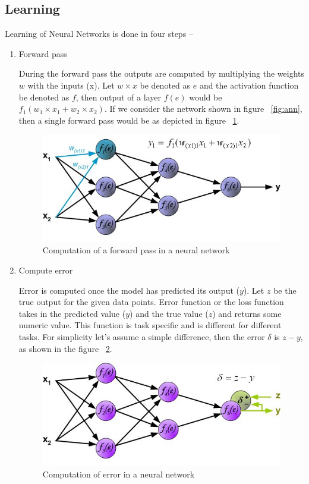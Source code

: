 \subsection{Learning \label{lbl:learning}}


Learning of Neural Networks is done in four steps --

\begin{enumerate}
	\item Forward pass

During the forward pass the outputs are computed by multiplying the weights $w$ with the inputs (x). Let $w \times x$ be denoted as $e$ and the activation function be denoted as $f$, then output of a layer $f(e)$ would be $f_1(w_1 \times x_1 + w_2 \times x_2)$. 
If we consider the network shown in figure ~\ref{fig:ann}, then a single forward pass would be as depicted in figure ~\ref{fig:forward}.

\begin{figure}[H]
	\centering
   \includegraphics[scale=0.86]{figures/intro/forward.bmp}
   \caption[Forward pass]{Computation of a forward pass in a neural network}
   \label{fig:forward}
\end{figure}

	\item Compute error

Error is computed once the model has predicted its output ($y$). Let $z$ be the true output for the given data points. 
Error function or the loss function takes in the predicted value ($y$) and the true value ($z$) and returns some numeric value.
This function is task specific and is different for different tasks. For simplicity let's assume a simple difference, then the error $\delta$ is $z-y$, as shown in the figure ~\ref{fig:error}.

\begin{figure}[H]
	\centering
   \includegraphics[scale=0.86]{figures/intro/error.bmp}
   \caption[Compute error]{Computation of error in a neural network}
   \label{fig:error}
\end{figure}



\end{enumerate}
